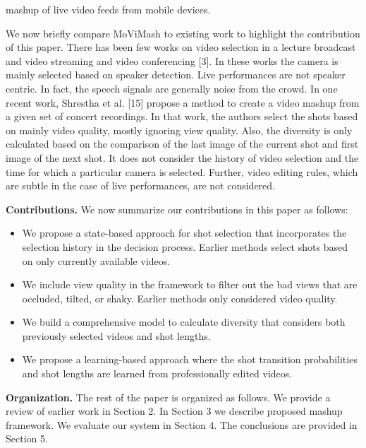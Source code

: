 \documentclass{sig-alternate-05-2015}
\begin{document}
mashup of live video feeds from mobile devices.\par
We now briefly compare MoViMash to existing work to highlight
the contribution of this paper. There has been few works on
video selection in a lecture broadcast and video streaming \cite{economou1983green} \cite{warneke2001smart}
and video conferencing [3]. In these works the camera is mainly
selected based on speaker detection. Live performances are not
speaker centric. In fact, the speech signals are generally noise from
the crowd. In one recent work, Shrestha et al. [15] propose a
method to create a video mashup from a given set of concert recordings.
In that work, the authors select the shots based on mainly
video quality, mostly ignoring view quality. Also, the diversity is
only calculated based on the comparison of the last image of the
current shot and first image of the next shot. It does not consider
the history of video selection and the time for which a particular
camera is selected. Further, video editing rules, which are subtle in
the case of live performances, are not considered.\par
\textbf{Contributions.} We now summarize our contributions in this paper as follows:\\
\begin{itemize}
  \item We propose a state-based approach for shot selection that incorporates the selection history in the decision process. Earlier methods select shots based on only currently available videos.
  \item We include view quality in the framework to filter out the bad views that are occluded, tilted, or shaky. Earlier methods only considered video quality.
  \item We build a comprehensive model to calculate diversity that considers both previously selected videos and shot lengths.
  \item We propose a learning-based approach where the shot transition probabilities and shot lengths are learned from professionally edited videos.
\end{itemize}
\textbf{Organization.} The rest of the paper is organized as follows.
We provide a review of earlier work in Section 2. In Section 3 we
describe proposed mashup framework. We evaluate our system in
Section 4. The conclusions are provided in Section 5.
\end{document}
